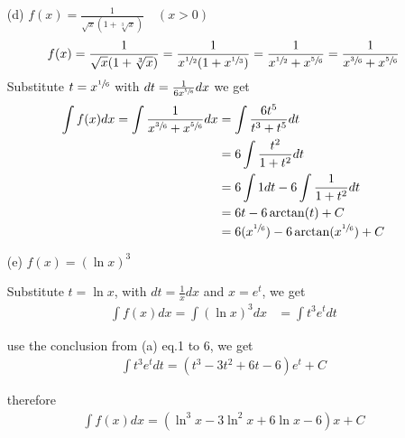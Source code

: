 \begin{enumerate}
\newpage

\item[(d)]$f(x)=\frac{1}{\sqrt{x}(1+\sqrt[3]{x})} \hspace{1em} (x>0)$
\begin{align}
f(x)
=\frac{1}{\sqrt{x}(1+\sqrt[3]{x})}
=\frac{1}{x^{\sfrac{1}{2}}(1+x^{\sfrac{1}{3}})}
=\frac{1}{x^{\sfrac{1}{2}}+x^{\sfrac{5}{6}}}
=\frac{1}{x^{\sfrac{3}{6}}+x^{\sfrac{5}{6}}}
\end{align}
Substitute $t=x^{\sfrac{1}{6}}$ with $dt=\frac{1}{6x^{\sfrac{5}{6}}}dx$ we get
\begin{align}
\int f(x)dx=\int\frac{1}{x^{\sfrac{3}{6}}+x^{\sfrac{5}{6}}}dx
&=\int\frac{6t^5}{t^3+t^5}dt \\
&=6\int\frac{t^2}{1+t^2}dt \\
&=6\int 1dt-6\int\frac{1}{1+t^2}dt \\
&=6t-6\arctan(t)+C \\
&=6(x^{\sfrac{1}{6}})-6\arctan(x^{\sfrac{1}{6}})+C
\end{align}

\item[(e)]$f(x)=(\ln x)^3$

Substitute $t=\ln x$, with $dt=\frac{1}{x}dx$ and $x=e^t$, we get
\begin{align}
\int f(x)dx=\int (\ln x)^3 dx
&=\int t^3 e^t dt
\end{align}

use the conclusion from (a) eq.1 to 6, we get
\begin{align}
\int t^3 e^t dt=(t^3-3t^2+6t-6)e^t+C
\end{align}

therefore
\begin{align}
\int f(x)dx=(\ln^3 x-3\ln^2 x+6\ln x-6)x+C
\end{align}

\end{enumerate}